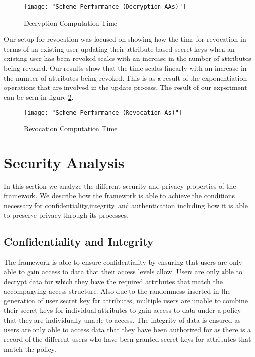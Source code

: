 \begin{figure}[]
	\centering
	\texttt{[image: "Scheme Performance (Decryption\_AAs)"]}
	\caption{Decryption Computation Time}
	\label{fig:res_dec_aas}
\end{figure}

Our setup for revocation was focused on showing how the time for revocation in terms of an existing user updating their attribute based secret keys when an existing user has been revoked scales with an increase in the number of attributes being revoked. Our results show that the time scales linearly with an increase in the number of attributes being revoked. This is as a result of the exponentiation operations that are involved in the update process. The result of our experiment can be seen in figure \ref{fig:res_rev_as}.

\begin{figure}[]
	\centering
	\texttt{[image: "Scheme Performance (Revocation\_As)"]}
	\caption{Revocation Computation Time}
	\label{fig:res_rev_as}
\end{figure}

\section{Security Analysis}

In this section we analyze the different security and privacy properties of the framework. We describe how the framework is able to achieve the conditions necessary for confidentiality,integrity, and authentication including how it is able to preserve privacy through its processes. 

\subsection*{Confidentiality and Integrity}

The framework is able to ensure confidentiality by ensuring that users are only able to gain access to data that their access levels allow. Users are only able to decrypt data for which they have the required attributes that match the accompanying access structure. Also due to the randomness inserted in the generation of user secret key for attributes, multiple users are unable to combine their secret keys for individual attributes to gain access to data under a policy that they are individually unable to access. The integrity of data is ensured as users are only able to access data that they have been authorized for as there is a record of the different users who have been granted secret keys for attributes that match the policy.

